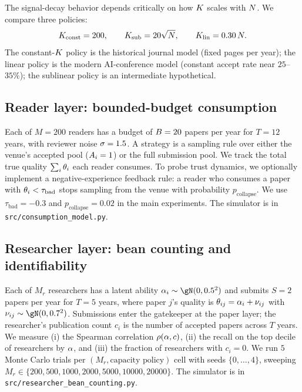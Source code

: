  The signal-decay behavior depends critically on how $K$ scales with $N$. We compare three policies:
\begin{equation}
    K_{\text{const}} = 200, \qquad K_{\text{sub}} = 20\sqrt{N}, \qquad K_{\text{lin}} = 0.30\,N.
\end{equation}
The constant-$K$ policy is the historical journal model (fixed pages per year); the linear policy is the modern AI-conference model (constant accept rate near $25$--$35\%$); the sublinear policy is an intermediate hypothetical.

\subsection{Reader layer: bounded-budget consumption}
\label{sec:method-reader}

Each of $M = 200$ readers has a budget of $B = 20$ papers per year for $T = 12$ years, with reviewer noise $\sigma=1.5$. A strategy is a sampling rule over either the venue's accepted pool ($A_i = 1$) or the full submission pool. We track the total true quality $\sum_i \theta_i$ each reader consumes. To probe trust dynamics, we optionally implement a negative-experience feedback rule: a reader who consumes a paper with $\theta_i < \tau_{\text{bad}}$ stops sampling from the venue with probability $p_{\text{collapse}}$. We use $\tau_{\text{bad}} = -0.3$ and $p_{\text{collapse}} = 0.02$ in the main experiments. The simulator is in \texttt{src/consumption\_model.py}.

\subsection{Researcher layer: bean counting and identifiability}
\label{sec:method-researcher}

Each of $M_r$ researchers has a latent ability $\ability_i \sim \gN(0, 0.5^2)$ and submits $S = 2$ papers per year for $T = 5$ years, where paper $j$'s quality is $\theta_{ij} = \alpha_i + \nu_{ij}$ with $\nu_{ij} \sim \gN(0, 0.7^2)$. Submissions enter the gatekeeper at the paper layer; the researcher's publication count $c_i$ is the number of accepted papers across $T$ years. We measure (i) the Spearman correlation $\rho(\alpha, c)$, (ii) the recall on the top decile of researchers by $\alpha$, and (iii) the fraction of researchers with $c_i = 0$. We run $5$ Monte Carlo trials per $(M_r, \text{capacity policy})$ cell with seeds $\{0,\dots,4\}$, sweeping $M_r \in \{200, 500, 1000, 2000, 5000, 10000, 20000\}$. The simulator is in \texttt{src/researcher\_bean\_counting.py}.

